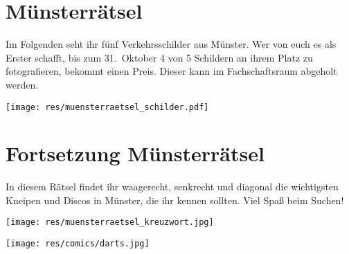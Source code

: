 \section{Münsterrätsel}
Im Folgenden seht ihr fünf Verkehrsschilder aus Münster. Wer von euch es als Erster schafft, bis zum 31.~Oktober 4 von 5 Schildern an ihrem Platz zu fotografieren, bekommt einen Preis. Dieser kann im Fachschaftsraum abgeholt werden.

\vspace{0cm plus 1cm}
\texttt{[image: res/muensterraetsel\_schilder.pdf]}

\section*{Fortsetzung Münsterrätsel}
In diesem Rätsel findet ihr waagerecht, senkrecht und diagonal die wichtigsten Kneipen und Discos in Münster, die ihr kennen sollten. Viel Spaß beim Suchen!

\begin{center}
\texttt{[image: res/muensterraetsel\_kreuzwort.jpg]}

\texttt{[image: res/comics/darts.jpg]}
\end{center}

